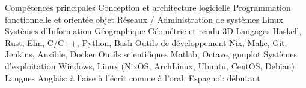 \begin{cvskills}
  \cvskill
    {Compétences principales}
 	{
        Conception et architecture logicielle \newline
        Programmation fonctionnelle et orientée objet \newline
        Réseaux / Administration de systèmes Linux \newline
        Systèmes d'Information Géographique \lastnewline
	 	Géométrie et rendu 3D
	}
  \cvskill
    {Langages}
 	{Haskell, Rust, Elm, C/C++, Python, Bash}
  \cvskill
	{Outils de développement}
	{Nix, Make, Git, Jenkins, Ansible, Docker}
  \cvskill
	{Outils scientifiques}
	{Matlab, Octave, gnuplot}
  \cvskill
    {Systèmes d'exploitation}
 	{Windows, Linux (NixOS, ArchLinux, Ubuntu, CentOS, Debian)}
  \cvskill
    {Langues}
 	{
        Anglais: à l'aise à l'écrit comme à l'oral,
        Espagnol: débutant
    }
\end{cvskills}

